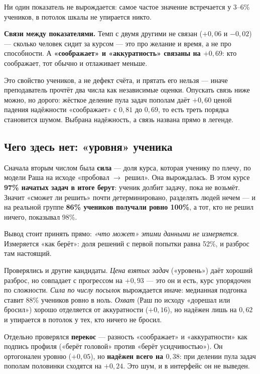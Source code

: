 \documentclass[11pt,a4paper]{article}
\begin{document}
Ни один показатель не вырождается: самое частое значение встречается у 3--6\%
учеников, в потолок шкалы не упирается никто.

\textbf{Связи между показателями.} Темп с двумя другими не связан ($+0{,}06$ и
$-0{,}02$) --- сколько человек сидит за курсом --- это про желание и время, а не
про способности. А \textbf{«соображает» и «аккуратность» связаны на $+0{,}69$}:
кто соображает, тот обычно и отлаживает меньше.

Это свойство учеников, а не дефект счёта, и прятать его нельзя --- иначе
преподаватель прочтёт два числа как независимые оценки. Опускать связь ниже
можно, но дорого: жёсткое деление пула задач пополам даёт $+0{,}60$ ценой
падения надёжности «соображает» с $0{,}81$ до $0{,}69$, то есть треть порядка
становится шумом. Выбрана надёжность, а связь названа прямо в легенде.

\subsection*{Чего здесь нет: «уровня» ученика}

Сначала вторым числом была \textbf{сила} --- доля курса, которая ученику по
плечу, по модели Раша на исходе «пробовал $\to$ решил». Она вырождалась. В этом
курсе \textbf{97\% начатых задач в итоге берут}: ученик долбит задачу, пока не
возьмёт. Значит «сможет ли решить» почти детерминировано, разделять людей нечем
--- и на реальной группе \textbf{86\% учеников получали ровно 100\%}, а тот, кто
не решил ничего, показывал 98\%.

Вывод стоит принять прямо: \emph{«что может» этими данными не измеряется}.
Измеряется «как берёт»: доля решений с первой попытки равна 52\%, и разброс там
настоящий.

Проверялись и другие кандидаты. \emph{Цена взятых задач} («уровень») даёт
хороший разброс, но совпадает с прогрессом на $+0{,}93$ --- это он и есть, курс
упорядочен по сложности. \emph{Сила по числу посылок} вырождается иначе:
медианная подгонка ставит 88\% учеников ровно в ноль. \emph{Охват} (Раш по
исходу «дорешал или бросил») хорошо отделяется от аккуратности ($+0{,}16$), но
надёжен лишь на $0{,}62$ и упирается в потолок у тех, кто ничего не бросил.

Отдельно проверялся \textbf{перекос} --- разность «соображает» и «аккуратности»
как подпись профиля («берёт головой» против «берёт усидчивостью»). Он
ортогонален уровню ($+0{,}05$), но \textbf{надёжен всего на $0{,}38$}: при
делении пула задач пополам половинки сходятся на $+0{,}24$. Это шум, и в
интерфейс он не выведен.
\end{document}
